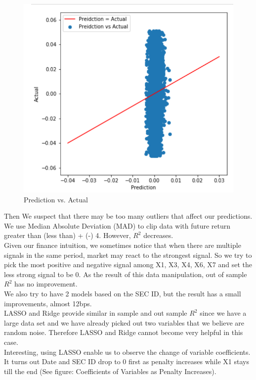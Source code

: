 \documentclass[onecolumn]{article}
\begin{document}
\begin{figure}[H]
\centering
\includegraphics[scale=0.5]{Reg_Pred_vs_Act.PNG}
\caption{Prediction vs. Actual}
\label{fig:label}
\end{figure}

\indent Then We suspect that there may be too many outliers that affect our predictions. We use Median Absolute Deviation (MAD) to clip data with future return greater than (less than) + (-) 4. However, $R^{2}$ decreases.\\
\indent Given our finance intuition, we sometimes notice that when there are multiple signals in the same period, market may react to the strongest signal. So we try to pick the most positive and negative signal among X1, X3, X4, X6, X7 and set the less strong signal to be 0. As the result of this data manipulation, out of sample $R^2$ has no improvement.\\
\indent We also try to have 2 models based on the SEC ID, but the result has a small improvements, almost 12bps.\\
\indent LASSO and Ridge provide similar in sample and out sample $R^{2}$ since we have a large data set and we have already picked out two variables that we believe are random noise. Therefore LASSO and Ridge cannot become very helpful in this case.\\
\indent Interesting, using LASSO enable us to observe the change of variable coefficients. It turns out Date and SEC ID drop to 0 first as penalty increases while X1 stays till the end (See figure: Coefficients of Variables as Penalty Increases).
\end{document}
